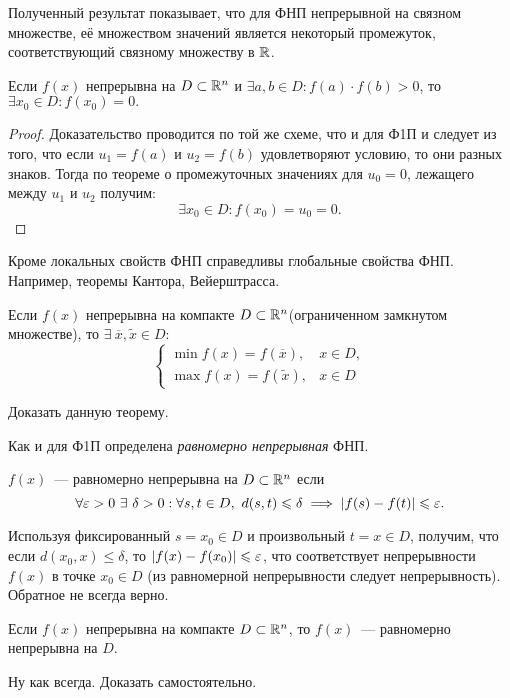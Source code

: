 \documentclass[../../main.tex]{subfiles}
\begin{document}
	\begin{rem}
		Полученный результат показывает, что для ФНП непрерывной на связном
		множестве, её множеством значений является некоторый промежуток,
		соответствующий связному множеству в $\mathbb{R}$.
	\end{rem}
	
    \begin{crl*}
			Если $f(x)$ непрерывна на $D \subset \mathbb{R}^n$ и $\exists a,b \in D: 
			f(a) \cdot f(b) > 0$, то $\exists x_0 \in D : f(x_0) = 0.$
	\end{crl*}
	
    \begin{proof}
    	Доказательство проводится по той же схеме, что и для Ф1П и следует из 
    	того, что если $u_1 = f(a)$ и $u_2 = f(b)$ удовлетворяют условию, то 
    	они разных знаков. Тогда по теореме о промежуточных значениях для 
    	$u_0 = 0$, лежащего между $u_1$ и $u_2$ получим:
    	\[\exists x_0 \in D: f(x_0) = u_0 = 0.\] 
    \end{proof}
	
	Кроме локальных свойств ФНП справедливы глобальные свойства ФНП. Например,
	теоремы Кантора, Вейерштрасса.
	\begin{thm}[Вейерштрасс]
		Если $f(x)$ непрерывна на компакте $D \subset \mathbb{R}^n$(ограниченном 
		замкнутом множестве), то $\exists\ \overline{x}, \widetilde{x} \in D:$
		\[ 
		\begin{cases}
		\min f(x) = f(\overline{x}),& x \in D, \\
		\max f(x) = f(\widetilde{x}),& x \in D
		\end{cases}
		\]
	\end{thm}
	\begin{exc}
		Доказать данную теорему.
	\end{exc}
	
	Как и для Ф1П определена \emph{равномерно непрерывная} ФНП.
	\begin{defn}
		$f(x)$~--- равномерно непрерывна на $D \subset \mathbb{R}^n$ если 
		\[
			\forall \eps > 0 \ \exists \ \delta > 0 : \forall s, t \in D,\ 
			d(s, t) \leq \delta \implies |f(s) - f(t)| \leq \eps.
		\]
	\end{defn}
	
	Используя фиксированный $s = x_0 \in D$ и произвольный $t = x \in D$, 
	получим, что если $d(x_0, x) \leq \delta$, то $|f(x) - f(x_0)| \leqslant \varepsilon$,
	что соответствует непрерывности $f(x)$ в точке $x_0 \in D$ (из равномерной 
	непрерывности следует непрерывность). Обратное не всегда верно.
	
	\begin{thm}[Кантор]
		Если $f(x)$ непрерывна на компакте $D \subset \mathbb{R}^n$, то $f(x)$~---
		равномерно непрерывна на $D$.
	\end{thm} 
	
	\begin{exc}
		Ну как всегда. Доказать самостоятельно.
	\end{exc}
\end{document}
